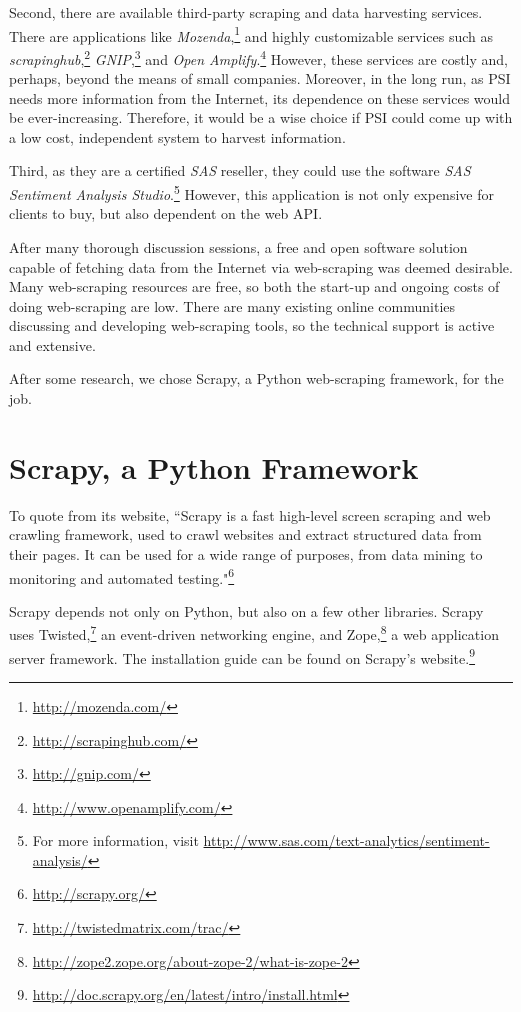 \documentclass[12pt,twoside,draft]{report}
\begin{document}
Second, there are available third-party scraping and data harvesting services. There are applications like \textit{Mozenda},\footnote{\url{http://mozenda.com/}} and highly customizable services such as \textit{scrapinghub},\footnote{\url{http://scrapinghub.com/}} \textit{GNIP},\footnote{\url{http://gnip.com/}} and \textit{Open Amplify}.\footnote{\url{http://www.openamplify.com/}} However, these services are costly and, perhaps, beyond the means of small companies. Moreover, in the long run, as PSI needs more information from the Internet, its dependence on these services would be ever-increasing. Therefore, it would be a wise choice if PSI could come up with a low cost, independent system to harvest information. 

Third, as they are a certified \textit{SAS} reseller, they could use the software \textit{SAS Sentiment Analysis Studio}.\footnote{For more information, visit \url{http://www.sas.com/text-analytics/sentiment-analysis/}} However, this application is not only expensive for clients to buy, but also dependent on the web API. 

After many thorough discussion sessions, a free and open software solution capable of fetching data from the Internet via web-scraping was deemed desirable. Many web-scraping resources are free, so both the start-up and ongoing costs of doing web-scraping are low. There are many existing online communities discussing and developing web-scraping tools, so the technical support is active and extensive.

After some research, we chose Scrapy, a Python web-scraping framework, for the job.

\section{Scrapy, a Python Framework}

To quote from its website, ``Scrapy is a fast high-level screen scraping and web crawling framework, used to crawl websites and extract structured data from their pages. It can be used for a wide range of purposes, from data mining to monitoring and automated testing."\footnote{\url{http://scrapy.org/}}

Scrapy depends not only on Python, but also on a few other libraries. Scrapy uses Twisted,\footnote{\url{http://twistedmatrix.com/trac/}} an event-driven networking engine, and Zope,\footnote{\url{http://zope2.zope.org/about-zope-2/what-is-zope-2}} a web application server framework. The installation guide can be found on Scrapy's website.\footnote{\url{http://doc.scrapy.org/en/latest/intro/install.html}}
\end{document}
